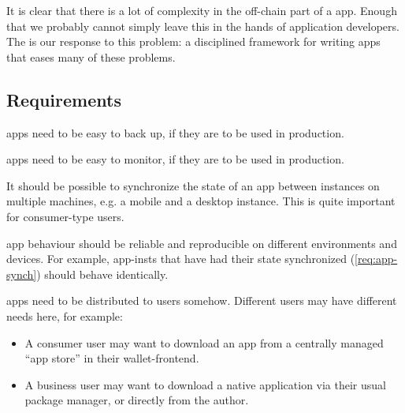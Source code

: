 It is clear that there is a lot of complexity in the \gls{off-chain} part of a \gls{app}.
Enough that we probably cannot simply leave this in the hands of application developers.
The  is our response to this problem: a disciplined framework for writing \glspl{app} that eases many of these problems.

\subsection{Requirements}
\begin{requirement}[Backups]
\label{req:app-backups}
\Glspl{app} need to be easy to back up, if they are to be used in production.
\end{requirement}

\begin{requirement}[Monitoring]
\label{req:app-monitoring}
\Glspl{app} need to be easy to monitor, if they are to be used in production.
\end{requirement}

\begin{requirement}[Synchronization]
\label{req:app-synch}
It should be possible to synchronize the state of an \gls{app} between instances on multiple machines, e.g. a mobile and a desktop instance.
This is quite important for consumer-type users.
\end{requirement}

\begin{requirement}[Reproducibility]
\label{req:app-reproducibility}
\Gls{app} behaviour should be reliable and reproducible on different environments and devices.
For example, \glspl{app-inst} that have had their state synchronized (\cref{req:app-synch}) should behave identically.
\end{requirement}

\begin{requirement}[Distribution]
\label{req:app-dist}
\Glspl{app} need to be distributed to users somehow.
Different users may have different needs here, for example:
\begin{itemize}
\item A consumer user may want to download an \gls{app} from a centrally managed ``app store'' in their \gls{wallet-frontend}.
\item A business user may want to download a native application via their usual package manager, or directly from the author.
\end{itemize}
\end{requirement}


